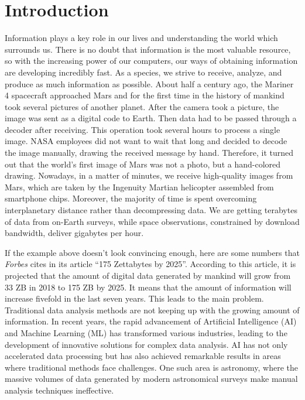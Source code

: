 
% 

\chapter{Introduction}

Information plays a key role in our lives and understanding the world which surrounds us. There is no doubt that information is the most valuable resource, so with the increasing power of our computers, our ways of obtaining information are developing incredibly fast. As a species, we strive to receive, analyze, and produce as much information as possible. About half a century ago, the Mariner 4 spacecraft approached Mars and for the first time in the history of mankind took several pictures of another planet. After the camera took a picture, the image was sent as a digital code to Earth. Then data had to be passed through a decoder after receiving. This operation took several hours to process a single image. NASA employees did not want to wait that long and decided to decode the image manually, drawing the received message by hand. Therefore, it turned out that the world's first image of Mars was not a photo, but a hand-colored drawing. Nowadays, in a matter of minutes, we receive high-quality images from Mars, which are taken by the Ingenuity Martian helicopter assembled from smartphone chips. Moreover, the majority of time is spent overcoming interplanetary distance rather than decompressing data. We are getting terabytes of data from on-Earth surveys, while space observations, constrained by download bandwidth, deliver gigabytes per hour.

If the example above doesn't look convincing enough, here are some numbers that \emph{Forbes} cites in its article \enquote{175 Zettabytes by 2025}. According to this article, it is projected that the amount of digital data generated by mankind will grow from 33 ZB in 2018 to 175 ZB by 2025. It means that the amount of information will increase fivefold in the last seven years. This leads to the main problem. Traditional data analysis methods are not keeping up with the growing amount of information. In recent years, the rapid advancement of Artificial Intelligence (AI) and Machine Learning (ML) has transformed various industries, leading to the development of innovative solutions for complex data analysis. AI has not only accelerated data processing but has also achieved remarkable results in areas where traditional methods face challenges. One such area is astronomy, where the massive volumes of data generated by modern astronomical surveys make manual analysis techniques ineffective.

